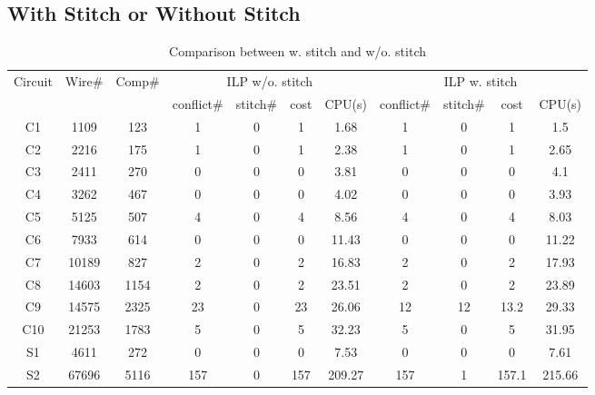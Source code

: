 \documentclass[12pt]{spieman}
\theoremstyle{plain}
\begin{document}
\begin{spacing}{1}
\subsection{With Stitch or Without Stitch}


\iffalse
\begin{table*}[htb]
\centering
\renewcommand{\arraystretch}{0.9}
\caption{Comparison between w. stitch and w/o. stitch}
\label{tab:tplec_stitch}
\resizebox{16.4cm}{!} {
\begin{tabular}{|c|c|c |c|c|c|c||c|c|c|c||}
  \hline \hline
  \multirow{2}{*}{Circuit} &\multirow{2}{*}{Wire\#}  &\multirow{2}{*}{Comp\#} &\multicolumn{4}{c||}{ILP w/o. stitch} & \multicolumn{4}{c|}{ILP w. stitch}\\
  \cline{4-11} &        &         &conflict\# &stitch\#  & cost & CPU(s)        &conflict\#    &stitch\#      &cost  & CPU(s) \\
  \hline
 C1           &1109    &123        &1     &0   &1     &1.68        &1     &0   &1      &1.5    \\
 C2           &2216    &175        &1     &0   &1     &2.38        &1     &0   &1      &2.65   \\ 
 C3           &2411    &270        &0     &0   &0     &3.81        &0     &0   &0      &4.1    \\
 C4           &3262    &467        &0     &0   &0     &4.02        &0     &0   &0      &3.93   \\ 
 C5           &5125    &507        &4     &0   &4     &8.56        &4     &0   &4      &8.03   \\ 
 C6           &7933    &614        &0     &0   &0     &11.43       &0     &0   &0      &11.22  \\ 
 C7           &10189   &827        &2     &0   &2     &16.83       &2     &0   &2      &17.93  \\ 
 C8           &14603   &1154       &2     &0   &2     &23.51       &2     &0   &2      &23.89  \\ 
 C9           &14575   &2325       &23    &0   &23    &26.06       &12    &12  &13.2   &29.33  \\ 
 C10          &21253   &1783       &5     &0   &5     &32.23       &5     &0   &5      &31.95  \\ 
 S1           &4611    &272        &0     &0   &0     &7.53        &0     &0   &0      &7.61   \\ 
 S2           &67696   &5116       &157   &0   &157   &209.27      &157   &1   &157.1  &215.66 \\ 

\end{tabular}}
\end{table*}
\end{spacing}
\end{document}
